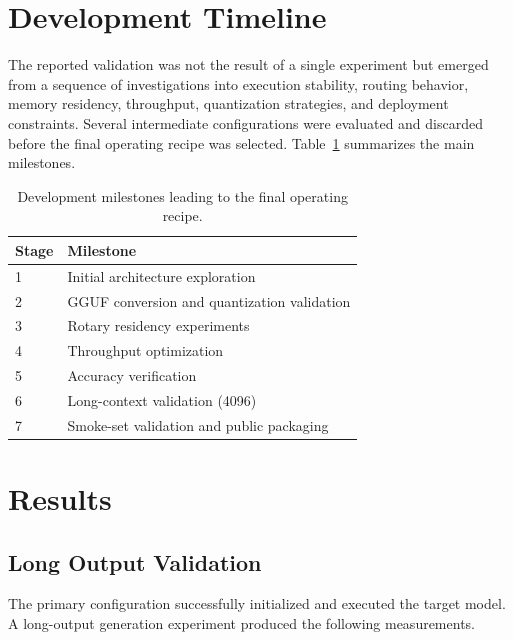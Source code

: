 \documentclass[11pt]{article}
\begin{document}
\section{Development Timeline}

The reported validation was not the result of a single experiment but emerged from a sequence of investigations into execution stability, routing behavior, memory residency, throughput, quantization strategies, and deployment constraints. Several intermediate configurations were evaluated and discarded before the final operating recipe was selected. Table~\ref{tab:timeline} summarizes the main milestones.

\begin{table}[h]
\centering
\begin{tabular}{ll}
\toprule
Stage & Milestone \\
\midrule
1 & Initial architecture exploration \\
2 & GGUF conversion and quantization validation \\
3 & Rotary residency experiments \\
4 & Throughput optimization \\
5 & Accuracy verification \\
6 & Long-context validation (4096) \\
7 & Smoke-set validation and public packaging \\
\bottomrule
\end{tabular}
\caption{Development milestones leading to the final operating recipe.}
\label{tab:timeline}
\end{table}

\section{Results}

\subsection{Long Output Validation}

The primary configuration successfully initialized and executed the target model. A long-output generation experiment produced the following measurements.
\end{document}
